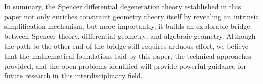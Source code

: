 \documentclass[a4paper,12pt]{extarticle}
\theoremstyle{plain}
\theoremstyle{definition}
\begin{document}
In summary, the Spencer differential degeneration theory established in this paper not only enriches constraint geometry theory itself by revealing an intrinsic simplification mechanism, but more importantly, it builds an explorable bridge between Spencer theory, differential geometry, and algebraic geometry. Although the path to the other end of the bridge still requires arduous effort, we believe that the mathematical foundations laid by this paper, the technical approaches provided, and the open problems identified will provide powerful guidance for future research in this interdisciplinary field.


 
\end{document}
